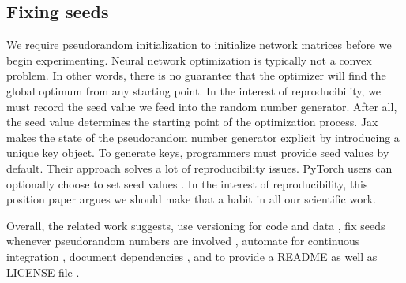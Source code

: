 \subsection{Fixing seeds}
We require pseudorandom initialization to initialize network matrices before we begin experimenting. Neural network optimization is typically not a convex problem. In other words, there is no guarantee that the optimizer will find the global optimum from any starting point.
In the interest of reproducibility, we must record the seed value we feed into the random number generator. After all, the seed value determines the starting point of the optimization process. Jax \cite{jax2018github} makes the state of the pseudorandom number generator explicit by introducing a unique key object. To generate keys, programmers must provide seed values by default. Their approach solves a lot of reproducibility issues.
PyTorch users can optionally choose to set seed values \cite{PyTorch2024randomness}. In the interest of reproducibility, this position paper argues we should make that a habit in all our scientific work.


Overall, the related work suggests,
use versioning for code and data \cite{Kjetil2013TenReproducible,NeuripsCodeguide},
fix seeds whenever pseudorandom numbers are involved \cite{Kjetil2013TenReproducible},
automate for continuous integration \cite{Yasset2016TenGit}, 
document dependencies \cite{NeuripsCodeguide,Andreas2012TenSoftware},
and to provide a README \cite{NeuripsCodeguide,Yasset2016TenGit} as well as LICENSE file \cite{Yasset2016TenGit}.
